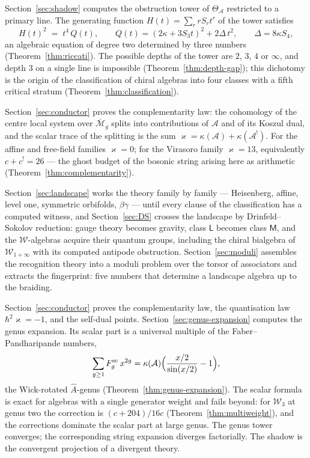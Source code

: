 \documentclass[11pt]{amsart}
\numberwithin{equation}{section}
\theoremstyle{plain}
\theoremstyle{definition}
\theoremstyle{remark}
\newcommand{\cA}{\mathcal{A}}
\newcommand{\cM}{\mathcal{M}}
\newcommand{\cW}{\mathcal{W}}
\newcommand{\Mbar}{\overline{\cM}}
\begin{document}
Section~\ref{sec:shadow} computes the obstruction tower of $\Theta_{\cA}$
restricted to a primary line. The generating function $H(t)=\sum_r rS_rt^r$
of the tower satisfies
\begin{equation}\label{eq:riccati-intro}
H(t)^{2}\;=\;t^{4}\,Q(t),\qquad
Q(t)=(2\kappa+3S_3t)^{2}+2\Delta\,t^{2},\qquad \Delta=8\kappa S_4,
\end{equation}
an algebraic equation of degree two determined by three numbers
(Theorem~\ref{thm:riccati}). The possible depths of the tower are $2$, $3$,
$4$ or $\infty$, and depth $3$ on a single line is impossible
(Theorem~\ref{thm:depth-gap}); this dichotomy is the origin of the
classification of chiral algebras into four classes with a fifth critical
stratum (Theorem~\ref{thm:classification}).

Section~\ref{sec:conductor} proves the complementarity law: the cohomology of
the centre local system over $\Mbar_g$ splits into contributions of $\cA$ and
of its Koszul dual, and the scalar trace of the splitting is the sum
$\varkappa=\kappa(\cA)+\kappa(\cA^{!})$. For the affine and free-field
families $\varkappa=0$; for the Virasoro family $\varkappa=13$, equivalently
$c+c^{!}=26$ --- the ghost budget of the bosonic string arising here as
arithmetic (Theorem~\ref{thm:complementarity}).

Section~\ref{sec:landscape} works the theory family by family ---
Heisenberg, affine, level one, symmetric orbifolds, $\beta\gamma$ ---
until every clause of the classification has a computed witness, and
Section~\ref{sec:DS} crosses the landscape by Drinfeld--Sokolov
reduction: gauge theory becomes gravity, class $\mathsf{L}$ becomes
class $\mathsf{M}$, and the $\cW$-algebras acquire their quantum
groups, including the chiral bialgebra of $\cW_{1+\infty}$ with its
computed antipode obstruction. Section~\ref{sec:moduli} assembles the
recognition theory into a moduli problem over the torsor of
associators and extracts the fingerprint: five numbers that determine
a landscape algebra up to the braiding.

Section~\ref{sec:conductor} proves the complementarity law, the
quantisation law $\hbar^{2}\varkappa=-1$, and the self-dual points.
Section~\ref{sec:genus-expansion} computes the genus expansion. Its scalar
part is a universal multiple of the Faber--Pandharipande numbers,
\begin{equation}
\sum_{g\geq1}F^{\mathrm{sc}}_{g}\,x^{2g}
=\kappa(\cA)\Bigl(\frac{x/2}{\sin(x/2)}-1\Bigr),
\end{equation}
the Wick-rotated $\widehat{A}$-genus (Theorem~\ref{thm:genus-expansion}).
The scalar formula is exact for algebras with a single generator weight and
fails beyond: for $\cW_3$ at genus two the correction is $(c+204)/16c$
(Theorem~\ref{thm:multiweight}), and the corrections dominate the scalar part
at large genus. The genus tower converges; the corresponding string expansion
diverges factorially. The shadow is the convergent projection of a divergent
theory.
\end{document}
